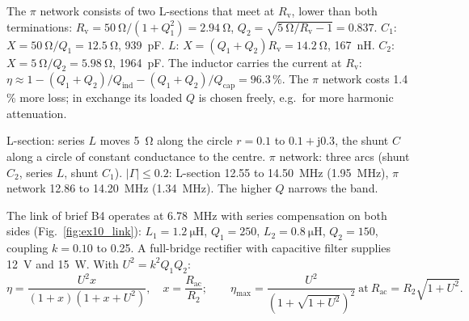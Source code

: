 
\begin{solutionblock}
	The $\pi$ network consists of two L-sections that meet at $R_\mathrm{v}$, lower than both terminations: $R_\mathrm{v}=\SI{50}{\ohm}/(1+Q_1^2)=\SI{2.94}{\ohm}$, $Q_2=\sqrt{\SI{5}{\ohm}/R_\mathrm{v}-1}=0.837$.
	$C_1$: $X=\SI{50}{\ohm}/Q_1=\SI{12.5}{\ohm}$, \SI{939}{\pico\farad}. $L$: $X=(Q_1+Q_2)R_\mathrm{v}=\SI{14.2}{\ohm}$, \SI{167}{\nano\henry}. $C_2$: $X=\SI{5}{\ohm}/Q_2=\SI{5.98}{\ohm}$, \SI{1964}{\pico\farad}.
	The inductor carries the current at $R_\mathrm{v}$: $\eta\approx1-(Q_1+Q_2)/Q_\mathrm{ind}-(Q_1+Q_2)/Q_\mathrm{cap}=96.3\,\%$. The $\pi$ network costs 1.4\,\% more loss; in exchange its loaded $Q$ is chosen freely, e.g.\ for more harmonic attenuation.
\end{solutionblock}


\begin{solutionblock}
	L-section: series $L$ moves \SI{5}{\ohm} along the circle $r=0.1$ to $0.1+\mathrm{j}0.3$, the shunt $C$ along a circle of constant conductance to the centre. $\pi$ network: three arcs (shunt $C_2$, series $L$, shunt $C_1$). $|\Gamma|\leq0.2$: L-section 12.55 to \SI{14.50}{\mega\hertz} (\SI{1.95}{\mega\hertz}), $\pi$ network 12.86 to \SI{14.20}{\mega\hertz} (\SI{1.34}{\mega\hertz}). The higher $Q$ narrows the band.
\end{solutionblock}



The link of brief B4 operates at \SI{6.78}{\mega\hertz} with series compensation on both sides (Fig.~\ref{fig:ex10_link}): $L_1=\SI{1.2}{\micro\henry}$, $Q_1=250$, $L_2=\SI{0.8}{\micro\henry}$, $Q_2=150$, coupling $k=0.10$ to 0.25. A full-bridge rectifier with capacitive filter supplies \SI{12}{\volt} and \SI{15}{\watt}. With $U^2=k^2Q_1Q_2$:
\begin{equation}
	\eta=\frac{U^2x}{(1+x)(1+x+U^2)},\quad x=\frac{R_\mathrm{ac}}{R_2};\qquad \eta_\mathrm{max}=\frac{U^2}{\left(1+\sqrt{1+U^2}\right)^2}\ \text{at}\ R_\mathrm{ac}=R_2\sqrt{1+U^2}.
\end{equation}

